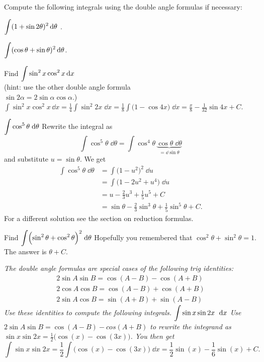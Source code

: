 \begin{multicols}{2}

Compute the following integrals using the double angle formulas if necessary:

\problem $\displaystyle\int(1+\sin2\theta)^2\, \mathrm{d} \theta$ . %

\problem $\displaystyle\int(\cos \theta+\sin\theta)^2\, \mathrm{d} \theta$. %

\problem Find $\displaystyle\int \sin^2x \cos^2x\, \mathrm{d} x$\\ %
(hint: use the other double angle formula\\
$\sin2\alpha = 2\sin\alpha \cos\alpha$.)
\answer %
$ \int \sin^2x \cos^2x\, \dd
x = \frac14\int \sin^2 2x\;\dd x = \frac18\int \bigl(1-\cos 4x\bigr)\;\dd x =
\frac{x} {8} -\frac{1} {32}\sin 4x +C$.
\endanswer

\problem $\displaystyle \int\cos^5\theta\;\mathrm{d} \theta$ %
\answer Rewrite the integral as %
\[
\int \cos^5\theta\;\dd \theta = \int \cos ^4\theta\,
\underbrace{\cos\theta\;\dd\theta}_{=\dd\sin\theta}
\]
and substitute $u=\sin \theta$.  We get
\begin{align*}
  \int \cos^5\theta\;\dd \theta
  &=\int \bigl(1-u^2\bigr)^2 \;\dd u\\
  &=\int \bigl(1-2u^2+u^4\bigr)\;\dd u\\
  &=u-\frac23u^3+\frac15u^5+C\\
  &=\sin\theta -\frac23\sin^3\theta + \frac15\sin^5\theta +C.
\end{align*}
For a different solution see the section on reduction formulas.
\endanswer

\problem Find $\displaystyle\int \Bigl(\sin^2\theta + \cos^2\theta\Bigr)^2\;\mathrm{d}\theta$ %
\answer Hopefully you remembered that $\cos^2\theta+\sin^2\theta =1$.  The %
answer is $\theta+C$.
\endanswer


\noindent\itshape\color{darkbluegreen}
The double angle formulas are special cases of the following trig identities:
\begin{gather*}
  2\sin A \sin B = \cos(A-B) - \cos (A+B)\\
  2\cos A \cos B = \cos(A-B) + \cos (A+B)\\
  2\sin A \cos B = \sin(A+B) + \sin (A-B)
\end{gather*}
Use these identities to compute the following integrals.\upshape
\color{black}
\problem $\displaystyle \int \sin x \sin 2x \ \;\mathrm{d} x$ %
\answer %
Use $2\sin A \sin B = \cos(A-B) - cos (A+B)$ to rewrite the integrand as
$\sin x\sin 2x = \frac12 \bigl(\cos (x) - \cos (3x) \bigr)$.  You then get
\[
\int \sin x\sin 2x
= \frac12 \int \bigl(\cos (x) - \cos (3x) \bigr) \; \dd x
= \frac12\sin (x) - \frac16 \sin(x) + C.
\]
\endanswer


\end{multicols}

